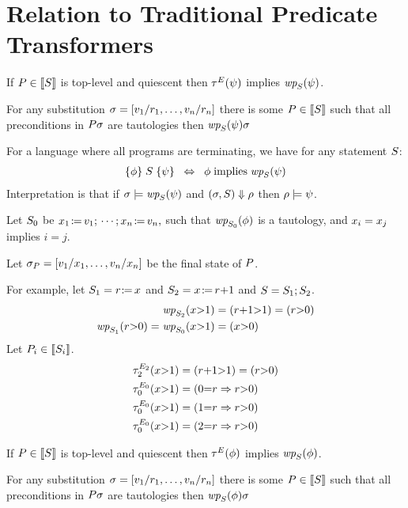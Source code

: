 \section{Relation to Traditional Predicate Transformers}

\begin{proposition}
  If $P\in\llbracket S\rrbracket$ is top-level and quiescent then 
  $\aTr{\aEvs}{\bForm}$ implies $\fwp{\aCmd}{\bForm}$.

  For any substitution $\sigma=[{v_1/r_1},\ldots, {v_n/r_n}]$ there is some
  $P\in\llbracket S\rrbracket$ %
  such that all preconditions in $P\sigma$ are tautologies then 
  $\fwp{\aCmd}{\bForm}\aSub$
\end{proposition}

For a language where all programs are
terminating, we have for any statement $S$:
\begin{align*}
  \hoare{\aForm}{\aCmd}{\bForm} 
  \;\;\Leftrightarrow\;\;
  \aForm \textimplies \fwp{\aCmd}{\bForm}
\end{align*}
Interpretation is that if $\aState\models\fwp{\aCmd}{\bForm}$ and
$(\sigma,S)\Downarrow\rho$
then $\rho\models\psi$.

Let $S_0$ be
\begin{math}
  \PW{\aLoc_1}{\aVal_1}\SEMI\cdots\SEMI \PW{\aLoc_n}{\aVal_n}, 
\end{math}
such that $\fwp{\aCmd_0}{\aForm}$ is a tautology, and $x_i=x_j$
implies $i=j$.

Let $\sigma_P=[{v_1/x_1},\ldots, {v_n/x_n}]$ be the final
state of $P$.


For example, let $\aCmd_1=\PR{x}{r}$ and $\aCmd_2=\PW{x}{r{+}1}$ and
$S=S_1\mathtt{;}\,\allowbreak S_2$.
\begin{align*}
  \fwp{\aCmd_2}{x{>}1}&=(r{+}1{>}1) = (r{>}0)
  \\
  \fwp{\aCmd_1}{r{>}0}=\fwp{\aCmd_0}{x{>}1}&=(x{>}0)
\end{align*}
Let $P_i\in\llbracket S_i\rrbracket$.
\begin{align*}
  \aTr[2]{\aEvs_2}{x{>}1}&=(r{+}1{>}1) = (r{>}0)
  \\
  \aTr[0]{\aEvs_0}{x{>}1}&=(0{=}\aReg \limplies r{>}0)
  \\
  \aTr[0]{\aEvs_0}{x{>}1}&=(1{=}\aReg \limplies r{>}0)
  \\
  \aTr[0]{\aEvs_0}{x{>}1}&=(2{=}\aReg \limplies r{>}0)
\end{align*}

\begin{proposition}
  If $P\in\llbracket S\rrbracket$ is top-level and quiescent then 
  $\aTr{\aEvs}{\aForm}$ implies $\fwp{\aCmd}{\aForm}$.

  For any substitution $\sigma=[{v_1/r_1},\ldots, {v_n/r_n}]$ there is some
  $P\in\llbracket S\rrbracket$ %
  such that all preconditions in $P\sigma$ are tautologies then 
  $\fwp{\aCmd}{\aForm}\aSub$
\end{proposition}

